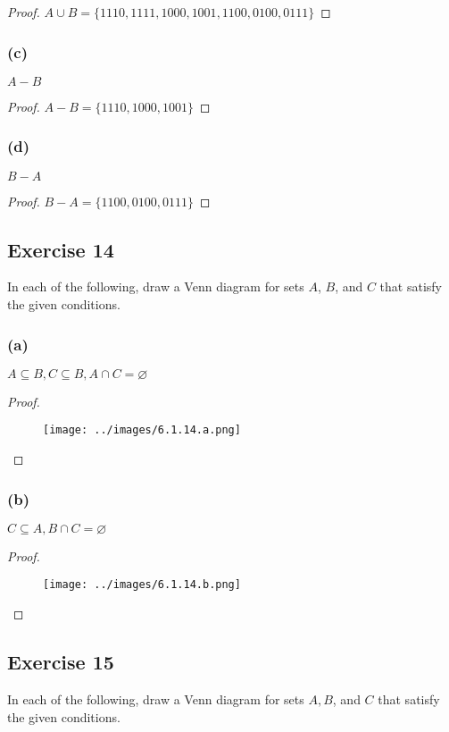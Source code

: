 \documentclass[14pt]{extarticle}
\newcommand{\es}{\varnothing}
\begin{document}
\begin{proof}
  \(A \cup B = \{1110, 1111, 1000, 1001, 1100, 0100, 0111\}\)
\end{proof}

\subsubsection{(c)}
$A - B$

\begin{proof}
  \(A - B = \{1110, 1000, 1001\}\)
\end{proof}

\subsubsection{(d)}
$B - A$

\begin{proof}
  \(B - A = \{1100, 0100, 0111\}\)
\end{proof}

\subsection{Exercise 14}
In each of the following, draw a Venn diagram for sets $A$, $B$, and $C$ that satisfy the given conditions.

\subsubsection{(a)}
\(A \subseteq B, C \subseteq B, A \cap C = \es\)

\begin{proof}
  \begin{figure}[ht!]
    \centering
    \texttt{[image: ../images/6.1.14.a.png]}
  \end{figure}
\end{proof}

\subsubsection{(b)}
\(C \subseteq A, B \cap C = \es\)

\begin{proof}
  \begin{figure}[ht!]
    \centering
    \texttt{[image: ../images/6.1.14.b.png]}
  \end{figure}
\end{proof}

\subsection{Exercise 15}
In each of the following, draw a Venn diagram for sets $A, B$, and $C$ that satisfy the given conditions.
\end{document}
